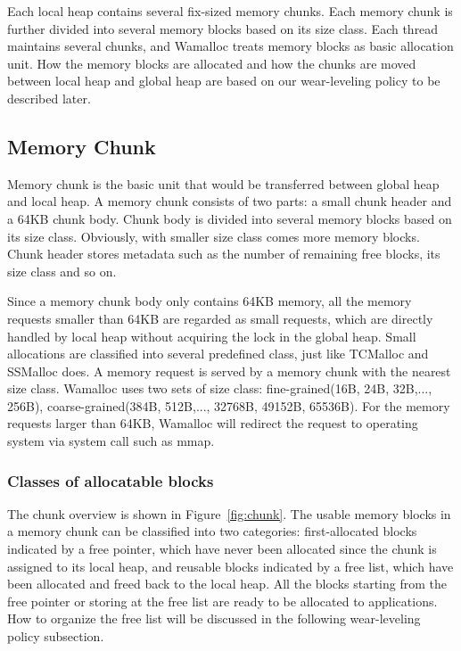 \documentclass[10pt, conference, compsocconf]{IEEEtran}
\begin{document}
Each local heap contains several fix-sized memory chunks.
Each memory chunk is further divided into several memory blocks based on its size class.
Each thread maintains several chunks, and Wamalloc treats memory blocks as basic allocation unit.
How the memory blocks are allocated and how the chunks are moved between local heap and global heap
are based on our wear-leveling policy to be described later.

\subsection{Memory Chunk}

Memory chunk is the basic unit that would be transferred between global heap and local heap. 
A memory chunk consists of two parts: a small chunk header and a 64KB chunk body. 
Chunk body is divided into several memory blocks based on its size class.
Obviously, with smaller size class comes more memory blocks. 
Chunk header stores metadata such as the number of remaining free blocks, its size class and so on.

Since a memory chunk body only contains 64KB memory, all the memory requests smaller than 64KB are regarded as small requests,
which are directly handled by local heap without acquiring the lock in the global heap.
Small allocations are classified into several predefined class,
just like TCMalloc\cite{ghemawat2009tcmalloc} and SSMalloc\cite{liu2012ssmalloc} does. 
A memory request is served by a memory chunk with the nearest size class. 
Wamalloc uses two sets of size class: fine-grained(16B, 24B, 32B,..., 256B), coarse-grained(384B, 512B,..., 32768B, 49152B, 65536B). 
For the memory requests larger than 64KB, Wamalloc will redirect the request to operating system via system call such as mmap.

\subsubsection{Classes of allocatable blocks}
The chunk overview is shown in Figure~\ref{fig:chunk}.
The usable memory blocks in a memory chunk can be classified into two categories:
first-allocated blocks indicated by a free pointer,
which have never been allocated since the chunk is assigned to its local heap,
and reusable blocks indicated by a free list, which have been allocated and freed back to the local heap.
All the blocks starting from the free pointer or storing at the free list are ready to be allocated to applications. 
How to organize the free list will be discussed in the following wear-leveling policy subsection.
\end{document}
